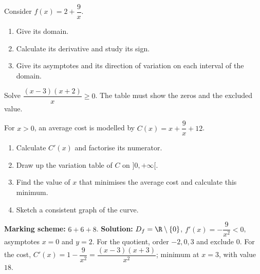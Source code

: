 \begin{exercise}
Consider $f(x)=2+\dfrac{9}x$.
\begin{enumerate}
\item Give its domain.
\item Calculate its derivative and study its sign.
\item Give its asymptotes and its direction of variation on each interval of the domain.
\end{enumerate}
\end{exercise}
\begin{exercise}
Solve $\dfrac{(x-3)(x+2)}x\geq0$. The table must show the zeros and the excluded value.
\end{exercise}
\begin{exercise}
For $x>0$, an average cost is modelled by $C(x)=x+\dfrac{9}x+12$.
\begin{enumerate}
\item Calculate $C'(x)$ and factorise its numerator.
\item Draw up the variation table of $C$ on $]0,+\infty[$.
\item Find the value of $x$ that minimises the average cost and calculate this minimum.
\item Sketch a consistent graph of the curve.
\end{enumerate}
\end{exercise}
\begin{solution}\textbf{Marking scheme:} $6+6+8$. \textbf{Solution:} $D_f=\R\setminus\{0\}$, $f'(x)=-\dfrac{9}{x^2}<0$, asymptotes $x=0$ and $y=2$. For the quotient, order $-2,0,3$ and exclude $0$. For the cost, $C'(x)=1-\dfrac{9}{x^2}=\dfrac{(x-3)(x+3)}{x^2}$; minimum at $x=3$, with value $18$.\end{solution}

